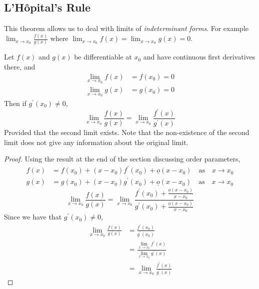 \documentclass{article}
\begin{document}
\subsection{L'H\^opital's Rule}
This theorem allows us to deal with limits of \emph{indeterminant forms}. For example $\lim_{x \rightarrow x_0}{\frac{f(x)}{g(x)}}$ where $\lim_{x \rightarrow x_0}{f(x)} = \lim_{x \rightarrow x_0}{g(x)} = 0$.

\begin{thm}
    Let $f(x)$ and $g(x)$ be differentiable at $x_0$ and have continuous first derivatives there, and
    \begin{align*}
        \lim_{x \rightarrow x_0}{f(x)} &= f(x_0) = 0 \\
        \lim_{x \rightarrow x_0}{g(x)} &= g(x_0) = 0
    \end{align*}
    Then if $g^{\prime}(x_0) \neq 0$,
    \[
        \lim_{x \rightarrow x_0}{\frac{f(x)}{g(x)}} = \lim_{x \rightarrow x_0}{\frac{f^{\prime}(x)}{g^{\prime}(x)}}
    \]
    Provided that the second limit exists. Note that the non-existence of the second limit does not give any information about the original limit.
\end{thm}

\begin{proof}
    Using the result at the end of the section discussing order parameters,
    \begin{align*}
        f(x) &= f(x_0) + (x - x_0)f^{\prime}(x_0) + \underline{o}(x - x_0) \quad \text{as} \quad x \rightarrow x_0 \\
        g(x) &= g(x_0) + (x - x_0)g^{\prime}(x_0) + \underline{o}(x - x_0) \quad \text{as} \quad x \rightarrow x_0
    \end{align*}
    \[
        \lim_{x \rightarrow x_0}{\frac{f(x)}{g(x)}} = \lim_{x \rightarrow x_0}{\frac{f^{\prime}(x_0) + \frac{\underline{o}(x - x_0)}{x - x_0}}{g^{\prime}(x_0) + \frac{\underline{o}(x - x_0)}{x - x_0}}}
    \]
    Since we have that $g^{\prime}(x_0) \neq 0$, 
    \begin{align*}
        \lim_{x \rightarrow x_0}{\frac{f(x)}{g(x)}} &= \frac{f^{\prime}(x_0)}{g^{\prime}(x_0)} \\
        &= \frac{\lim_{x \rightarrow x_0}{f^{\prime}(x)}}{\lim_{x \rightarrow x_0}{g^{\prime}(x)}} \tag{assuming continuous first derivatives}\\
        &= \lim_{x \rightarrow x_0}{\frac{f^{\prime}(x)}{g^{\prime}(x)}} \tag{already checked $g(x_0) \neq 0$}
    \end{align*}
\end{proof}
\end{document}
